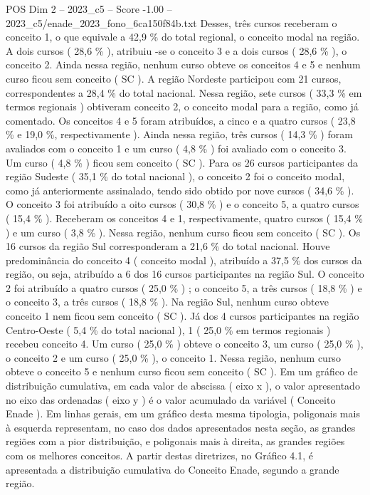 \begin{textsample}{POS Dim 2 – 2023\_c5 – Score -1.00 – 2023\_c5/enade\_2023\_fono\_6ca150f84b.txt}
Desses, três cursos receberam o conceito 1, o que equivale a 42,9 \% do total regional, o conceito modal na região.
A dois cursos ( 28,6 \% ), atribuiu -se o conceito 3 e a dois cursos ( 28,6 \% ), o conceito 2.
Ainda nessa região, nenhum curso obteve os conceitos 4 e 5 e nenhum curso ficou sem conceito ( SC ).
A região Nordeste participou com 21 cursos, correspondentes a 28,4 \% do total nacional.
Nessa região, sete cursos ( 33,3 \% em termos regionais ) obtiveram conceito 2, o conceito modal para a região, como já comentado.
Os conceitos 4 e 5 foram atribuídos, a cinco e a quatro cursos ( 23,8 \% e 19,0 \%, respectivamente ).
Ainda nessa região, três cursos ( 14,3 \% ) foram avaliados com o conceito 1 e um curso ( 4,8 \% ) foi avaliado com o conceito 3.
Um curso ( 4,8 \% ) ficou sem conceito ( SC ).
Para os 26 cursos participantes da região Sudeste ( 35,1 \% do total nacional ), o conceito 2 foi o conceito modal, como já anteriormente assinalado, tendo sido obtido por nove cursos ( 34,6 \% ).
O conceito 3 foi atribuído a oito cursos ( 30,8 \% ) e o conceito 5, a quatro cursos ( 15,4 \% ).
Receberam os conceitos 4 e 1, respectivamente, quatro cursos ( 15,4 \% ) e um curso ( 3,8 \% ).
Nessa região, nenhum curso ficou sem conceito ( SC ).
Os 16 cursos da região Sul corresponderam a 21,6 \% do total nacional.
Houve predominância do conceito 4 ( conceito modal ), atribuído a 37,5 \% dos cursos da região, ou seja, atribuído a 6 dos 16 cursos participantes na região Sul.
O conceito 2 foi atribuído a quatro cursos ( 25,0 \% ) ; o conceito 5, a três cursos ( 18,8 \% ) e o conceito 3, a três cursos ( 18,8 \% ).
Na região Sul, nenhum curso obteve conceito 1 nem ficou sem conceito ( SC ).
Já dos 4 cursos participantes na região Centro-Oeste ( 5,4 \% do total nacional ), 1 ( 25,0 \% em termos regionais ) recebeu conceito 4.
Um curso ( 25,0 \% ) obteve o conceito 3, um curso ( 25,0 \% ), o conceito 2 e um curso ( 25,0 \% ), o conceito 1.
Nessa região, nenhum curso obteve o conceito 5 e nenhum curso ficou sem conceito ( SC ).
Em um gráfico de distribuição cumulativa, em cada valor de abscissa ( eixo x ), o valor apresentado no eixo das ordenadas ( eixo y ) é o valor acumulado da variável ( Conceito Enade ).
Em linhas gerais, em um gráfico desta mesma tipologia, poligonais mais à esquerda representam, no caso dos dados apresentados nesta seção, as grandes regiões com a pior distribuição, e poligonais mais à direita, as grandes regiões com os melhores conceitos.
A partir destas diretrizes, no Gráfico 4.1, é apresentada a distribuição cumulativa do Conceito Enade, segundo a grande região.

\end{textsample}

